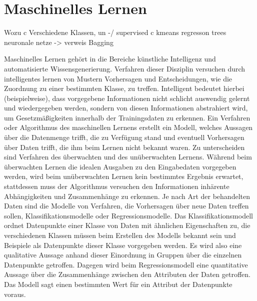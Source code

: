 \documentclass[
	12pt,
	a4paper,
	BCOR10mm,
	DIV14,
	listof=totoc,
	bibliography=totoc,
	headsepline
]{scrreprt}
\begin{document}

\section{Maschinelles Lernen}
Wozu c
Verschiedene Klassen, un -/ supervised c
kmeans
regresson trees
neuronale netze -> verweis
Bagging

Maschinelles Lernen gehört in die Bereiche künstliche Intelligenz und automatisierte Wissensgenerierung. Verfahren dieser Disziplin versuchen durch intelligentes lernen von Mustern Vorhersagen und Entscheidungen, wie die Zuordnung zu einer bestimmten Klasse, zu treffen. Intelligent bedeutet hierbei (beispielweise), dass vorgegebene Informationen nicht schlicht auswendig gelernt und wiedergegeben werden, sondern von diesen Informationen abstrahiert wird, um Gesetzmäßigkeiten innerhalb der Trainingsdaten zu erkennen. Ein Verfahren oder Algorithmus des maschinellen Lernens erstellt ein Modell, welches Aussagen über die Datenmenge trifft, die zu Verfügung stand und eventuell Vorhersagen über Daten trifft, die ihm beim Lernen nicht bekannt waren. 
Zu unterscheiden sind Verfahren des überwachten und des unüberwachten Lernens. Während beim überwachten Lernen die idealen Ausgaben zu den Eingabedaten vorgegeben werden, wird beim unüberwachten Lernen kein bestimmtes Ergebnis erwartet, stattdessen muss der Algorithmus versuchen den Informationen inhärente Abhängigkeiten und Zusammenhänge zu erkennen.
Je nach Art der behandelten Daten sind die Modelle von Verfahren, die Vorhersagen über neue Daten treffen sollen, Klassifikationsmodelle oder Regressionsmodelle. Das Klassifikationsmodell ordnet Datenpunkte einer Klasse von Daten mit ähnlichen Eigenschaften zu, die verschiedenen Klassen müssen beim Erstellen des Modells bekannt sein und Beispiele als Datenpunkte dieser Klasse vorgegeben werden. Es wird also eine qualitative Aussage anhand dieser Einordnung in Gruppen über die einzelnen Datenpunkte getroffen. Dagegen wird beim Regressionsmodell eine quantitative Aussage über die Zusammenhänge zwischen den Attributen der Daten getroffen. Das Modell sagt einen bestimmten Wert für ein Attribut der Datenpunkte voraus.  
\end{document}
